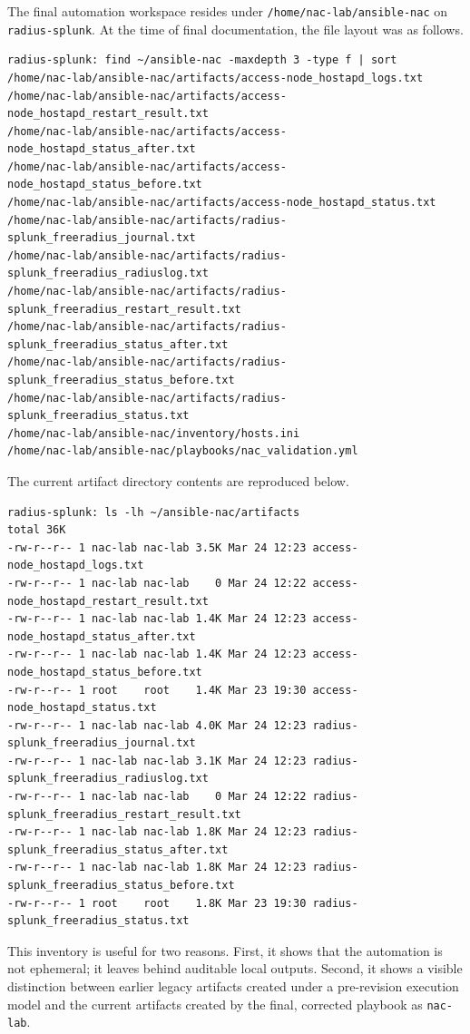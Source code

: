 \documentclass[11pt]{article}
\begin{document}
The final automation workspace resides under \texttt{/home/nac-lab/ansible-nac} on \texttt{radius-splunk}. At the time of final documentation, the file layout was as follows.

\begin{verbatim}
radius-splunk: find ~/ansible-nac -maxdepth 3 -type f | sort
/home/nac-lab/ansible-nac/artifacts/access-node_hostapd_logs.txt
/home/nac-lab/ansible-nac/artifacts/access-node_hostapd_restart_result.txt
/home/nac-lab/ansible-nac/artifacts/access-node_hostapd_status_after.txt
/home/nac-lab/ansible-nac/artifacts/access-node_hostapd_status_before.txt
/home/nac-lab/ansible-nac/artifacts/access-node_hostapd_status.txt
/home/nac-lab/ansible-nac/artifacts/radius-splunk_freeradius_journal.txt
/home/nac-lab/ansible-nac/artifacts/radius-splunk_freeradius_radiuslog.txt
/home/nac-lab/ansible-nac/artifacts/radius-splunk_freeradius_restart_result.txt
/home/nac-lab/ansible-nac/artifacts/radius-splunk_freeradius_status_after.txt
/home/nac-lab/ansible-nac/artifacts/radius-splunk_freeradius_status_before.txt
/home/nac-lab/ansible-nac/artifacts/radius-splunk_freeradius_status.txt
/home/nac-lab/ansible-nac/inventory/hosts.ini
/home/nac-lab/ansible-nac/playbooks/nac_validation.yml
\end{verbatim}

The current artifact directory contents are reproduced below.

\begin{verbatim}
radius-splunk: ls -lh ~/ansible-nac/artifacts
total 36K
-rw-r--r-- 1 nac-lab nac-lab 3.5K Mar 24 12:23 access-node_hostapd_logs.txt
-rw-r--r-- 1 nac-lab nac-lab    0 Mar 24 12:22 access-node_hostapd_restart_result.txt
-rw-r--r-- 1 nac-lab nac-lab 1.4K Mar 24 12:23 access-node_hostapd_status_after.txt
-rw-r--r-- 1 nac-lab nac-lab 1.4K Mar 24 12:23 access-node_hostapd_status_before.txt
-rw-r--r-- 1 root    root    1.4K Mar 23 19:30 access-node_hostapd_status.txt
-rw-r--r-- 1 nac-lab nac-lab 4.0K Mar 24 12:23 radius-splunk_freeradius_journal.txt
-rw-r--r-- 1 nac-lab nac-lab 3.1K Mar 24 12:23 radius-splunk_freeradius_radiuslog.txt
-rw-r--r-- 1 nac-lab nac-lab    0 Mar 24 12:22 radius-splunk_freeradius_restart_result.txt
-rw-r--r-- 1 nac-lab nac-lab 1.8K Mar 24 12:23 radius-splunk_freeradius_status_after.txt
-rw-r--r-- 1 nac-lab nac-lab 1.8K Mar 24 12:23 radius-splunk_freeradius_status_before.txt
-rw-r--r-- 1 root    root    1.8K Mar 23 19:30 radius-splunk_freeradius_status.txt
\end{verbatim}

This inventory is useful for two reasons. First, it shows that the automation is not ephemeral; it leaves behind auditable local outputs. Second, it shows a visible distinction between earlier legacy artifacts created under a pre-revision execution model and the current artifacts created by the final, corrected playbook as \texttt{nac-lab}.
\end{document}
